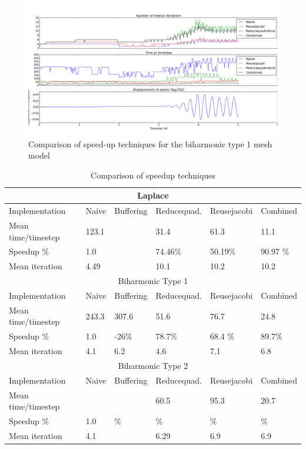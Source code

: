 \begin{figure}[h!]
 \includegraphics[scale=0.4]{./Fig/bi_compareit.png}
 \caption{Comparison of speed-up techniques for the biharmonic type 1 mesh model}
\end{figure}


\begin{table}[h!]
\centering
\caption{Comparison of speedup techniques}
\label{my-label}
\begin{tabular}{ |p{2.8cm}|p{2.2cm}|p{2.4cm}|p{2.4cm}|p{2.4cm}|p{2.4cm}| }
 \hline
  \multicolumn{6}{|c|}{Laplace} \\
 \hline
 Implementation       &Naive  & Buffering & Reducequad. & Reusejacobi & Combined \\
 \hline
 Mean time/timestep &  123.1    &  &  31.4 & 61.3  &  11.1 \\
 \hline
 Speedup \%            &  1.0         &  & 74.46\%     &  50.19\%     & 90.97 \%   \\
 \hline 
 Mean iteration         &  4.49       &  & 10.1  &  10.2  &  10.2 \\
 \hline 
  \hline
  \multicolumn{6}{|c|}{Biharmonic Type 1} \\
 \hline
 Implementation &Naive  & Buffering & Reducequad. & Reusejacobi & Combined \\
 \hline
 Mean time/timestep & 243.3 & 307.6  & 51.6 & 76.7  &  24.8 \\
 \hline
 Speedup \%    & 1.0     & -26\% & 78.7\%  & 68.4 \%  &  89.7\%   \\
 \hline
 Mean iteration & 4.1     &  6.2    &4.6&  7.1 &  6.8  \\
 \hline
  \hline
  \multicolumn{6}{|c|}{Biharmonic Type 2} \\
 \hline
 Implementation &Naive  & Buffering & Reducequad. & Reusejacobi & Combined \\
 \hline
 Mean time/timestep &        &            &   60.5   &   95.3     &  20.7  \\
 \hline
 Speedup \%             & 1.0  & \%     & \%          &  \%         &  \%   \\
 \hline
 Mean iteration           & 4.1 &           &  6.29     &   6.9        &  6.9  \\
 \hline 
\end{tabular}
\end{table}

